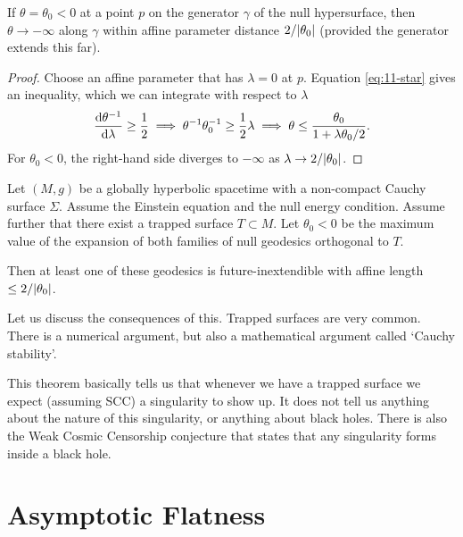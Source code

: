 \begin{corollary}
  If $\theta = \theta_0 < 0$ at a point $p$ on the generator $\gamma$ of the null hypersurface, then $\theta \to - \infty$ along $\gamma$ within affine parameter distance $2 / \abs{\theta_0}$ (provided the generator extends this far).
\end{corollary}
\begin{proof}
  Choose an affine parameter that has $\lambda = 0$  at $p$. 
  Equation \eqref{eq:11-star} gives an inequality, which we can integrate with respect to $\lambda$
  \begin{equation}
    \dv{\theta^{-1}}{\lambda} \geq \frac{1}{2} \implies \theta^{-1} \theta_0^{-1} \geq \frac{1}{2} \lambda \implies \theta \leq \frac{\theta_0}{1 + \lambda \theta_0 / 2}.
  \end{equation}
  For $\theta_0 < 0$, the right-hand side diverges to $- \infty$ as $\lambda \to 2/ \abs{\theta_0}$.
\end{proof}

\begin{theorem}[Penrose 1965]
  Let $(M, g)$ be a globally hyperbolic spacetime with a non-compact Cauchy surface $\Sigma$.
  Assume the Einstein equation and the null energy condition. Assume further that there exist a trapped surface $T \subset M$.
  Let $\theta_0 < 0$ be the maximum value of the expansion of both families of null geodesics orthogonal to $T$.

  Then at least one of these geodesics is future-inextendible with affine length $\leq 2 / \abs{\theta_0}$.
\end{theorem}

Let us discuss the consequences of this.
Trapped surfaces are very common. There is a numerical argument, but also a mathematical argument called `Cauchy stability'.

\begin{remark}
  This theorem basically tells us that whenever we have a trapped surface we expect (assuming SCC) a singularity to show up. It does not tell us anything about the nature of this singularity, or anything about black holes.
  There is also the Weak Cosmic Censorship conjecture that states that any singularity forms inside a black hole.
\end{remark}

\chapter{Asymptotic Flatness}%
\label{cha:asymptotic_flatness}

